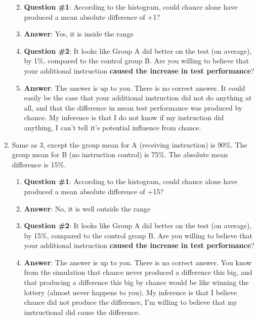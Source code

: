 \documentclass[]{book}
\providecommand{\tightlist}{%
  \setlength{\itemsep}{0pt}\setlength{\parskip}{0pt}}
\begin{document}
\begin{enumerate}
  \begin{enumerate}
  \def\labelenumii{\alph{enumii}.}
  \tightlist
  \item
    \textbf{Question \#1}: According to the histogram, could chance
    alone have produced a mean absolute difference of +1?
  \item
    \textbf{Answer}: Yes, it is inside the range
  \item
    \textbf{Question \#2}: It looks like Group A did better on the test
    (on average), by 1\%, compared to the control group B. Are you
    willing to believe that your additional instruction \textbf{caused
    the increase in test performance}?
  \item
    \textbf{Answer}: The answer is up to you. There is no correct
    answer. It could easily be the case that your additional instruction
    did not do anything at all, and that the difference in mean test
    performance was produced by chance. My inference is that I do not
    know if my instruction did anything, I can't tell it's potential
    influence from chance.
  \end{enumerate}
\item
  Same as 3, except the group mean for A (receiving instruction) is
  90\%. The group mean for B (no instruction control) is 75\%. The
  absolute mean difference is 15\%.

  \begin{enumerate}
  \def\labelenumii{\alph{enumii}.}
  \tightlist
  \item
    \textbf{Question \#1}: According to the histogram, could chance
    alone have produced a mean absolute difference of +15?
  \item
    \textbf{Answer}: No, it is well outside the range
  \item
    \textbf{Question \#2}: It looks like Group A did better on the test
    (on average), by 15\%, compared to the control group B. Are you
    willing to believe that your additional instruction \textbf{caused
    the increase in test performance}?
  \item
    \textbf{Answer}: The answer is up to you. There is no correct
    answer. You know from the simulation that chance never produced a
    difference this big, and that producing a difference this big by
    chance would be like winning the lottery (almost never happens to
    you). My inference is that I believe chance did not produce the
    difference, I'm willing to believe that my instructional did cause
    the difference.
  \end{enumerate}
\end{enumerate}
\end{document}
